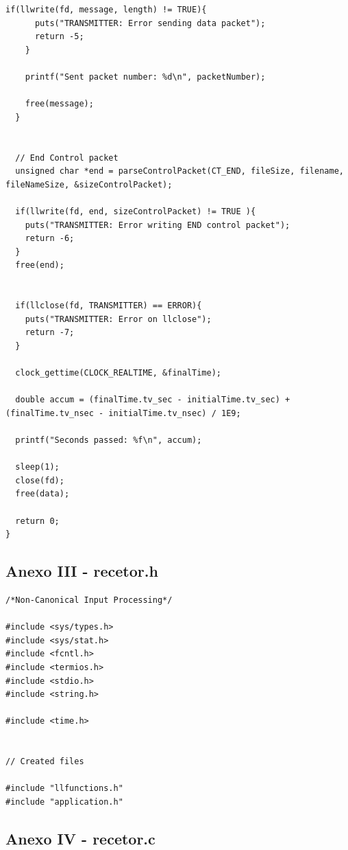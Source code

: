 \documentclass[11pt]{article}
\begin{document}
\begin{lstlisting}[style=CStyle]
    if(llwrite(fd, message, length) != TRUE){
      puts("TRANSMITTER: Error sending data packet");
      return -5;
    }

    printf("Sent packet number: %d\n", packetNumber);

    free(message);
  }


  // End Control packet
  unsigned char *end = parseControlPacket(CT_END, fileSize, filename, fileNameSize, &sizeControlPacket);

  if(llwrite(fd, end, sizeControlPacket) != TRUE ){
    puts("TRANSMITTER: Error writing END control packet");
    return -6;
  }
  free(end);


  if(llclose(fd, TRANSMITTER) == ERROR){
    puts("TRANSMITTER: Error on llclose");
    return -7;
  }

  clock_gettime(CLOCK_REALTIME, &finalTime);

  double accum = (finalTime.tv_sec - initialTime.tv_sec) + (finalTime.tv_nsec - initialTime.tv_nsec) / 1E9;

  printf("Seconds passed: %f\n", accum);

  sleep(1);
  close(fd);
  free(data);

  return 0;
}
\end{lstlisting}

\pagebreak

\subsection{Anexo III - recetor.h}

\begin{lstlisting}[style=CStyle]
/*Non-Canonical Input Processing*/

#include <sys/types.h>
#include <sys/stat.h>
#include <fcntl.h>
#include <termios.h>
#include <stdio.h>
#include <string.h>

#include <time.h>


// Created files

#include "llfunctions.h"
#include "application.h"
\end{lstlisting}

\pagebreak

\subsection{Anexo IV - recetor.c}
\end{document}
